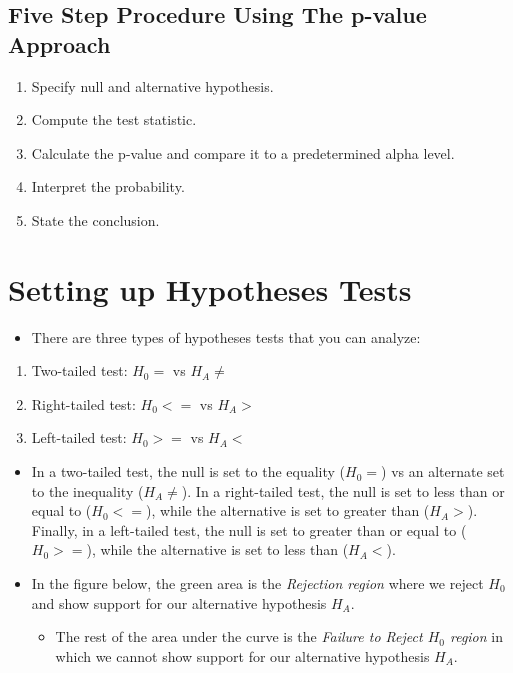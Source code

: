 \documentclass[
  letterpaper,
  DIV=11,
  numbers=noendperiod]{scrreprt}
\providecommand{\tightlist}{%
  \setlength{\itemsep}{0pt}\setlength{\parskip}{0pt}}\usepackage{longtable,booktabs,array}
\begin{document}
\subsection{Five Step Procedure Using The p-value
Approach}\label{five-step-procedure-using-the-p-value-approach}

\begin{enumerate}
\def\labelenumi{\arabic{enumi}.}
\tightlist
\item
  Specify null and alternative hypothesis.
\item
  Compute the test statistic.
\item
  Calculate the p-value and compare it to a predetermined alpha level.
\item
  Interpret the probability.
\item
  State the conclusion.
\end{enumerate}

\section{Setting up Hypotheses Tests}\label{setting-up-hypotheses-tests}

\begin{itemize}
\tightlist
\item
  There are three types of hypotheses tests that you can analyze:
\end{itemize}

\begin{enumerate}
\def\labelenumi{\arabic{enumi}.}
\tightlist
\item
  Two-tailed test: \(H_0 =\) vs \(H_A \neq\)
\item
  Right-tailed test: \(H_0 <=\) vs \(H_A >\)
\item
  Left-tailed test: \(H_0 >=\) vs \(H_A <\)
\end{enumerate}

\begin{itemize}
\item
  In a two-tailed test, the null is set to the equality (\(H_0 =\)) vs
  an alternate set to the inequality (\(H_A \neq\)). In a right-tailed
  test, the null is set to less than or equal to (\(H_0 <=\)), while the
  alternative is set to greater than (\(H_A >\)). Finally, in a
  left-tailed test, the null is set to greater than or equal to
  (\(H_0 >=\)), while the alternative is set to less than (\(H_A <\)).
\item
  In the figure below, the green area is the \emph{Rejection region}
  where we reject \(H_0\) and show support for our alternative
  hypothesis \(H_A\).

  \begin{itemize}
  \tightlist
  \item
    The rest of the area under the curve is the \emph{Failure to Reject
    \(H_0\) region} in which we cannot show support for our alternative
    hypothesis \(H_A\).
  \end{itemize}
\end{itemize}
\end{document}
